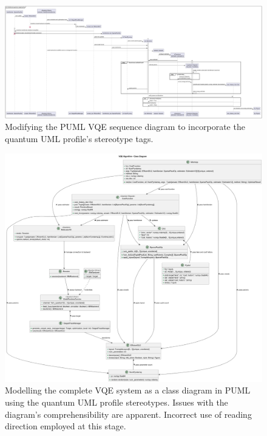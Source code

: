 \documentclass{article}
\begin{document}
\begin{figure}[H]
    \centering
    \includegraphics[width=1\linewidth]{vqe_uml_profile_sd_v1.png}
    \caption{Modifying the PUML VQE sequence diagram to incorporate the quantum UML profile's stereotype tags.}
    \label{fig:vqe_uml_profile_sd_v1}
\end{figure}

\begin{figure}[H]
    \centering
    \includegraphics[width=1\linewidth]{vqe_uml_profile_cd_v1-VQE_Algorithm___Class_Diagram.png}
    \caption{Modelling the complete VQE system as a class diagram in PUML using the quantum UML profile stereotypes. Issues with the diagram's comprehensibility are apparent. Incorrect use of reading direction employed at this stage.}
    \label{fig:vqe_uml_profile_cd_v1-VQE_Algorithm___Class_Diagram}
\end{figure}
\end{document}
